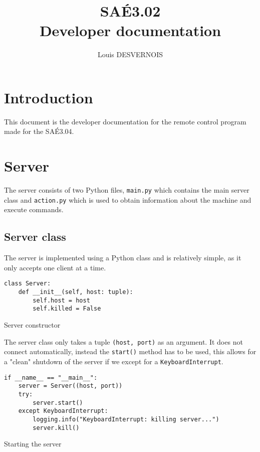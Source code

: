 \documentclass{article}
\author{Louis DESVERNOIS}
\title{%
    SAÉ3.02 \\
    \large Developer documentation}
\begin{document}
\maketitle
\tableofcontents
\listoffigures
\listoflistings

\newpage
\section{Introduction}
This document is the developer documentation for the remote control program made
for the SAÉ3.04.

\section{Server}
The server consists of two Python files, \verb|main.py| which contains the main
server class and \verb|action.py| which is used to obtain information about the
machine and execute commands.

\subsection{Server class}
The server is implemented using a Python class and is relatively simple, as it
only accepts one client at a time.

\begin{listing}[H]
    \begin{verbatim}
class Server:
    def __init__(self, host: tuple):
        self.host = host
        self.killed = False
    \end{verbatim}
    \caption{Server constructor}
    \label{serv:init}
\end{listing}

The server class only takes a tuple \verb|(host, port)| as an argument. It does
not connect automatically, instead the \verb|start()| method has to be used,
this allows for a "clean" shutdown of the server if we except for a
\verb|KeyboardInterrupt|.

\begin{listing}[H]
    \begin{verbatim}
if __name__ == "__main__":
    server = Server((host, port))
    try:
        server.start()
    except KeyboardInterrupt:
        logging.info("KeyboardInterrupt: killing server...")
        server.kill()
    \end{verbatim}
    \caption{Starting the server}
    \label{serv:start}
\end{listing}
\end{document}

